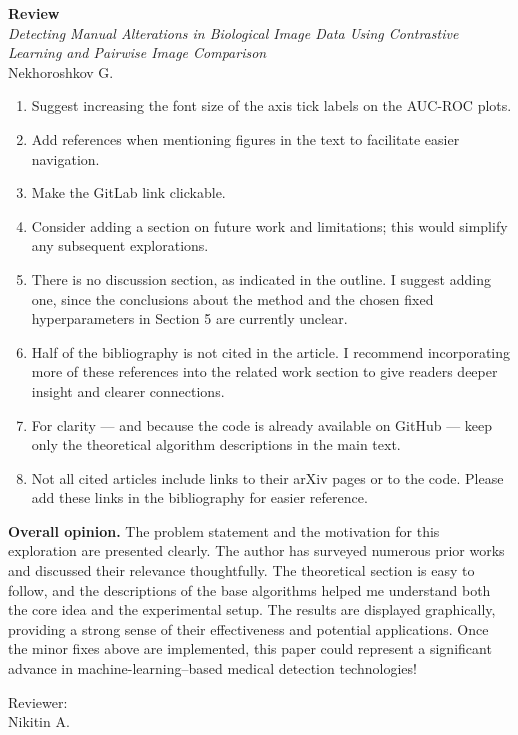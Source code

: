 \documentclass[a4paper,12pt]{article}
\begin{document}
\pagestyle{empty}

\begin{center}
  {\Large\textbf{Review}}\\[1em]
  {\large\textit{Detecting Manual Alterations in Biological Image Data Using Contrastive Learning and Pairwise Image Comparison}}\\[0.5em]
  {Nekhoroshkov G.}
\end{center}

\vspace{1em}

\begin{enumerate}[leftmargin=*, label=\arabic*.]
  \item Suggest increasing the font size of the axis tick labels on the AUC-ROC plots.
  \item Add references when mentioning figures in the text to facilitate easier navigation.
  \item Make the GitLab link clickable.
  \item Consider adding a section on future work and limitations; this would simplify any subsequent explorations.
  \item There is no discussion section, as indicated in the outline. I suggest adding one, since the conclusions about the 
  method and the chosen fixed hyperparameters in Section 5 are currently unclear.
  \item Half of the bibliography is not cited in the article. I recommend incorporating more of these references into the 
  related work section to give readers deeper insight and clearer connections.
  \item For clarity --- and because the code is already available on GitHub --- keep only the theoretical algorithm descriptions 
  in the main text.
  \item Not all cited articles include links to their arXiv pages or to the code. Please add these links in the bibliography 
  for easier reference.
\end{enumerate}

\vspace{1em}

\noindent\textbf{Overall opinion.} The problem statement and the motivation for this exploration are presented clearly. 
The author has surveyed numerous prior works and discussed their relevance thoughtfully. The theoretical section is easy to 
follow, and the descriptions of the base algorithms helped me understand both the core idea and the experimental setup. 
The results are displayed graphically, providing a strong sense of their effectiveness and potential applications. Once the 
minor fixes above are implemented, this paper could represent a significant advance in machine-learning–based medical 
detection technologies!

\vspace{2em}

\noindent Reviewer:\\
Nikitin A.
\end{document}
